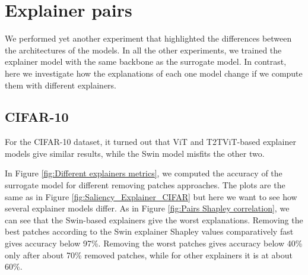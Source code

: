 \documentclass[magisterska,en]{pracamgr}
\begin{document}
\pagebreak
\section{Explainer pairs}



We performed yet another experiment that highlighted the differences between the architectures of the models. In all the other experiments, we trained the explainer model with the same backbone as the surrogate model. In contrast, here we investigate how the explanations of each one model change if we compute them with different explainers.



\subsection{CIFAR-10}
For the CIFAR-10 dataset, it turned out that ViT and T2T\textunderscore ViT-based explainer models give similar results, while the Swin model misfits the other two.


In Figure \ref{fig:Different explainers metrics}, we computed the accuracy of the surrogate model for different removing patches approaches. The plots are the same as in Figure \ref{fig:Saliency_Explainer_CIFAR} but here we want to see how several explainer models differ. As in Figure \ref{fig:Pairs Shapley correlation}, we can see that the Swin-based explainers give the worst explanations. Removing the best patches according to the Swin explainer Shapley values comparatively fast gives accuracy below 97\%. Removing the worst patches gives accuracy below 40\% only after about 70\% removed patches, while for other explainers it is at about 60\%.
\end{document}
